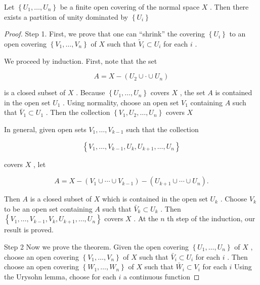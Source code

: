\begin{theorem}
	Let \(\left\{  {{U}_{1},\ldots ,{U}_{n}}\right\}\) be a finite open covering of the normal space \(X\) . Then there exists a partition of unity dominated by \(\left\{  {U}_{i}\right\}\)

\end{theorem}
\begin{proof}
Step 1. First, we prove that one can ``shrink'' the covering \(\left\{  {U}_{i}\right\}\) to an open covering \(\left\{  {{V}_{1},\ldots ,{V}_{n}}\right\}\) of \(X\) such that \({\widetilde{V}}_{i} \subset  {U}_{i}\) for each \(i\) .

We proceed by induction. First, note that the set

\[
A = X - \left( {{U}_{2} \cup   \cdot   \cup  {U}_{n}}\right)
\]

is a closed subset of \(X\) . Because \(\left\{  {{U}_{1},\ldots ,{U}_{n}}\right\}\) covers \(X\) , the set \(A\) is contained in the open set \({U}_{1}\) . Using normality, choose an open set \({V}_{1}\) containing \(A\) such that \({\bar{V}}_{1} \subset  {U}_{1}\) . Then the collection \(\left\{  {{V}_{1},{U}_{2},\ldots ,{U}_{n}}\right\}\) covers \(X\)

In general, given open sets \({V}_{1},\ldots ,{V}_{k - 1}\) such that the collection

\[
\left\{  {{V}_{1},\ldots ,{V}_{k - 1},{U}_{k},{U}_{k + 1},\ldots ,{U}_{n}}\right\}
\]

covers \(X\) , let

\[
A = X - \left( {{V}_{1} \cup  \cdots  \cup  {V}_{k - 1}}\right)  - \left( {{U}_{k + 1} \cup  \cdots  \cup  {U}_{n}}\right) .
\]

Then \(A\) is a closed subset of \(X\) which is contained in the open set \({U}_{k}\) . Choose \({V}_{k}\) to be an open set containing \(A\) such that \({\bar{V}}_{k} \subset  {U}_{k}\) . Then \(\left\{  {{V}_{1},\ldots ,{V}_{k - 1},{V}_{k},{U}_{k + 1},\ldots ,{U}_{n}}\right\}\) covers \(X\) . At the \(n\) th step of the induction, our result is proved.

Step 2 Now we prove the theorem. Given the open covering \(\left\{  {{U}_{1},\ldots ,{U}_{n}}\right\}\) of \(X\) , choose an open covering \(\left\{  {{V}_{1},\ldots ,{V}_{n}}\right\}\) of \(X\) such that \({\bar{V}}_{i} \subset  {U}_{i}\) for each \(i\) . Then choose an open covering \(\left\{  {{W}_{1},\ldots ,{W}_{n}}\right\}\) of \(X\) such that \({\bar{W}}_{i} \subset  {V}_{i}\) for each \(i\) Using the Urysohn lemma, choose for each \(i\) a continuous function


\end{proof}
